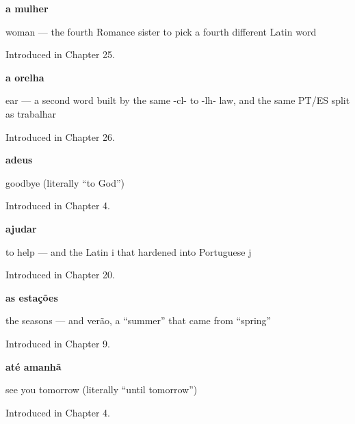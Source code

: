 \noindent\begin{minipage}[t]{\linewidth}
\raggedright
\textbf{a mulher}\par
\small woman — the fourth Romance sister to pick a fourth different Latin word\par
\footnotesize Introduced in Chapter 25.
\end{minipage}\par\medskip

\noindent\begin{minipage}[t]{\linewidth}
\raggedright
\textbf{a orelha}\par
\small ear — a second word built by the same -cl- to -lh- law, and the same PT/ES split as trabalhar\par
\footnotesize Introduced in Chapter 26.
\end{minipage}\par\medskip

\noindent\begin{minipage}[t]{\linewidth}
\raggedright
\textbf{adeus}\par
\small goodbye (literally \textquotedblleft{}to God\textquotedblright{})\par
\footnotesize Introduced in Chapter 4.
\end{minipage}\par\medskip

\noindent\begin{minipage}[t]{\linewidth}
\raggedright
\textbf{ajudar}\par
\small to help — and the Latin i that hardened into Portuguese j\par
\footnotesize Introduced in Chapter 20.
\end{minipage}\par\medskip

\noindent\begin{minipage}[t]{\linewidth}
\raggedright
\textbf{as estações}\par
\small the seasons — and verão, a \textquotedblleft{}summer\textquotedblright{} that came from \textquotedblleft{}spring\textquotedblright{}\par
\footnotesize Introduced in Chapter 9.
\end{minipage}\par\medskip

\noindent\begin{minipage}[t]{\linewidth}
\raggedright
\textbf{até amanhã}\par
\small see you tomorrow (literally \textquotedblleft{}until tomorrow\textquotedblright{})\par
\footnotesize Introduced in Chapter 4.
\end{minipage}\par\medskip

